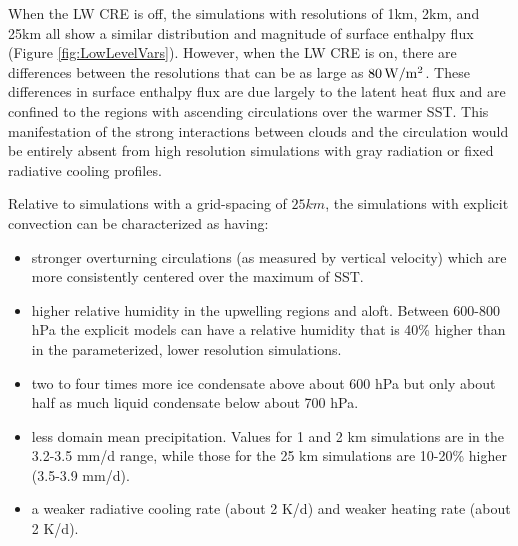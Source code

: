 \documentclass[11pt]{article}   	%
\begin{document}
When the LW CRE is off, the simulations with resolutions of 1km, 2km, and 25km all show a similar distribution and magnitude of surface 
enthalpy flux (Figure \ref{fig:LowLevelVars}).  However, when the LW CRE is on, there are differences between the resolutions that can be as 
large as $80 \, \rm{W/m^2}$.   These differences in surface enthalpy flux are due largely to the latent heat flux and are confined to the 
regions with ascending circulations over the warmer SST.  This manifestation of the strong interactions between clouds and the circulation 
would be entirely absent from high resolution simulations with gray radiation or fixed radiative cooling profiles.  


Relative to simulations with a grid-spacing of $25 \textit{km}$, the simulations with explicit convection can be characterized as having: 
\begin{itemize}
  \item stronger overturning circulations (as measured by vertical velocity) which are more consistently centered over the maximum of SST.  
  \item higher relative humidity in the upwelling regions and aloft.   Between 600-800 hPa the explicit models can have a relative humidity 
  that is 40\% higher than in the parameterized, lower resolution simulations.  
  \item two to four times more ice condensate above about 600 hPa but only about half as much liquid condensate below about 700 hPa.
  \item less domain mean precipitation.  Values for 1 and 2 km simulations are in the 3.2-3.5 mm/d range, while those for the 25 km 
  simulations are 10-20\% higher (3.5-3.9 mm/d).  
  \item a weaker radiative cooling rate (about 2 K/d) and weaker heating rate (about 2 K/d).
\end{itemize}
\end{document}
